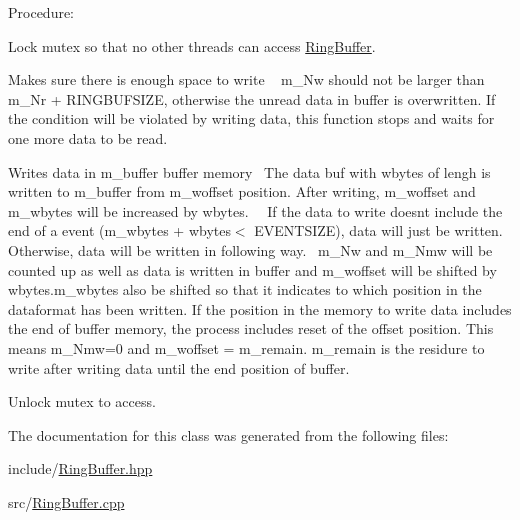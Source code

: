 Procedure\+:
\begin{DoxyItemize}
\item Lock mutex so that no other threads can access \hyperlink{classLSTDAQ_1_1RingBuffer}{Ring\+Buffer}.
\item Makes sure there is enough space to write ~\newline
 m\+\_\+\+Nw should not be larger than m\+\_\+\+Nr + R\+I\+N\+G\+B\+U\+F\+S\+I\+ZE, otherwise the unread data in buffer is overwritten. If the condition will be violated by writing data, this function stops and waits for one more data to be read.
\item Writes data in m\+\_\+buffer buffer memory~\newline
 The data buf with wbytes of lengh is written to m\+\_\+buffer from m\+\_\+woffset position. After writing, m\+\_\+woffset and m\+\_\+wbytes will be increased by wbytes. 　\+If the data to write doesn\textquotesingle{}t include the end of a event (m\+\_\+wbytes + wbytes$<$ E\+V\+E\+N\+T\+S\+I\+ZE), data will just be written. Otherwise, data will be written in following way.~\newline
 m\+\_\+\+Nw and m\+\_\+\+Nmw will be counted up as well as data is written in buffer and m\+\_\+woffset will be shifted by wbytes.\+m\+\_\+wbytes also be shifted so that it indicates to which position in the dataformat has been written. If the position in the memory to write data includes the end of buffer memory, the process includes reset of the offset position. This means m\+\_\+\+Nmw=0 and m\+\_\+woffset = m\+\_\+remain. m\+\_\+remain is the residure to write after writing data until the end position of buffer.
\item Unlock mutex to access. 
\end{DoxyItemize}

The documentation for this class was generated from the following files\+:\begin{DoxyCompactItemize}
\item 
include/\hyperlink{RingBuffer_8hpp}{Ring\+Buffer.\+hpp}\item 
src/\hyperlink{RingBuffer_8cpp}{Ring\+Buffer.\+cpp}\end{DoxyCompactItemize}
